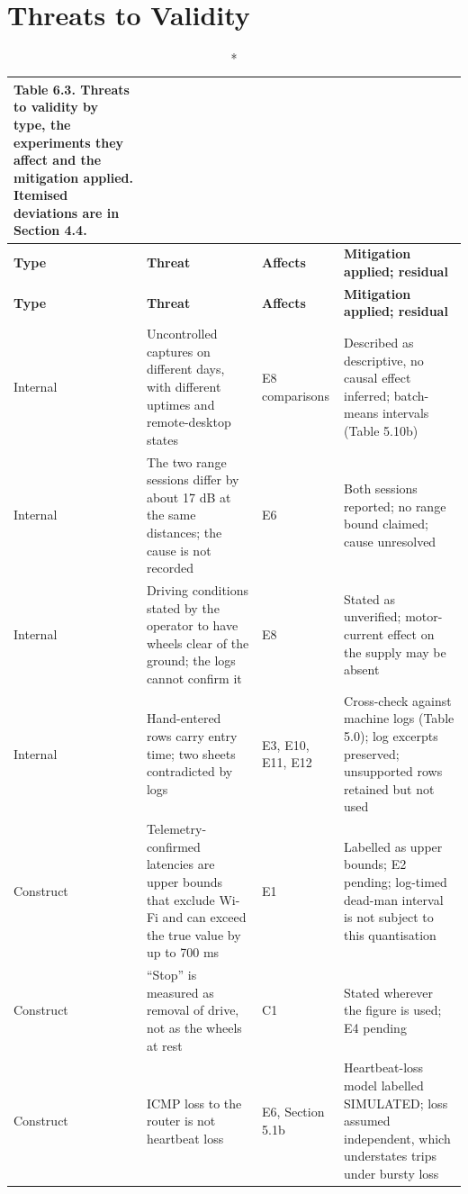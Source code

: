 \section{Threats to Validity}

\begin{center}
\footnotesize
\begin{longtable}{|p{1.6cm}|p{4.5cm}|p{2cm}|p{5cm}|}
\caption*{Table 6.3. Threats to validity by type, the experiments they affect and the mitigation applied. Itemised deviations are in Section 4.4.}
\addcontentsline{lot}{table}{\protect\numberline{6.3}Threats to validity by type, the experiments they affect and the mitigation applied. Itemised deviations are in Section 4.4.}
\\
\hline
\textbf{Type} & \textbf{Threat} & \textbf{Affects} & \textbf{Mitigation applied; residual} \\
\hline
\endfirsthead
\hline
\textbf{Type} & \textbf{Threat} & \textbf{Affects} & \textbf{Mitigation applied; residual} \\
\hline
\endhead
Internal & Uncontrolled captures on different days, with different uptimes and remote-desktop states & E8 comparisons & Described as descriptive, no causal effect inferred; batch-means intervals (Table 5.10b) \\
\hline
Internal & The two range sessions differ by about 17 dB at the same distances; the cause is not recorded & E6 & Both sessions reported; no range bound claimed; cause unresolved \\
\hline
Internal & Driving conditions stated by the operator to have wheels clear of the ground; the logs cannot confirm it & E8 & Stated as unverified; motor-current effect on the supply may be absent \\
\hline
Internal & Hand-entered rows carry entry time; two sheets contradicted by logs & E3, E10, E11, E12 & Cross-check against machine logs (Table 5.0); log excerpts preserved; unsupported rows retained but not used \\
\hline
Construct & Telemetry-confirmed latencies are upper bounds that exclude Wi-Fi and can exceed the true value by up to 700 ms & E1 & Labelled as upper bounds; E2 pending; log-timed dead-man interval is not subject to this quantisation \\
\hline
Construct & ``Stop'' is measured as removal of drive, not as the wheels at rest & C1 & Stated wherever the figure is used; E4 pending \\
\hline
Construct & ICMP loss to the router is not heartbeat loss & E6, Section 5.1b & Heartbeat-loss model labelled SIMULATED; loss assumed independent, which understates trips under bursty loss \\

\end{longtable}
\end{center}
